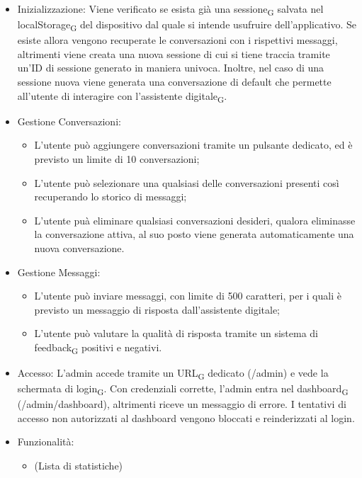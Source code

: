 \begin{itemize}
    \item Inizializzazione: 
    \newline \newline Viene verificato se esista già una sessione\textsubscript{G} salvata nel localStorage\textsubscript{G} del dispositivo dal quale si intende usufruire dell’applicativo. Se esiste allora vengono recuperate le conversazioni con i rispettivi messaggi, altrimenti viene creata una nuova sessione di cui si tiene traccia tramite un’ID di sessione generato in maniera univoca. Inoltre, nel caso di una sessione nuova viene generata una conversazione di default che permette all'utente di interagire con l'assistente digitale\textsubscript{G}. 
    \item Gestione Conversazioni:
    \begin{itemize}
        \item L'utente può aggiungere conversazioni tramite un pulsante dedicato, ed è previsto un limite di 10 conversazioni; 
        \item L'utente può selezionare una qualsiasi delle conversazioni presenti così recuperando lo storico di messaggi;
        \item L'utente puà eliminare qualsiasi conversazioni desideri, qualora eliminasse la conversazione attiva, al suo posto viene generata automaticamente una nuova conversazione. 
    \end{itemize}
     \item Gestione Messaggi:
     \begin{itemize}
         \item L'utente può inviare messaggi, con limite di 500 caratteri, per i quali è previsto un messaggio di risposta dall'assistente digitale;
         \item L'utente può valutare la qualità di risposta tramite un sistema di feedback\textsubscript{G} positivi e negativi.
     \end{itemize}
\end{itemize}
\begin{itemize}
    \item Accesso:
    \newline \newline L'admin accede tramite un URL\textsubscript{G} dedicato (/admin) e vede la schermata di login\textsubscript{G}. Con credenziali corrette, l'admin entra nel dashboard\textsubscript{G} (/admin/dashboard), altrimenti riceve un messaggio di errore. I tentativi di accesso non autorizzati al dashboard vengono bloccati e reinderizzati al login.
    \item Funzionalità:
    \begin{itemize}
        \item (Lista di statistiche)
    \end{itemize}
\end{itemize}

